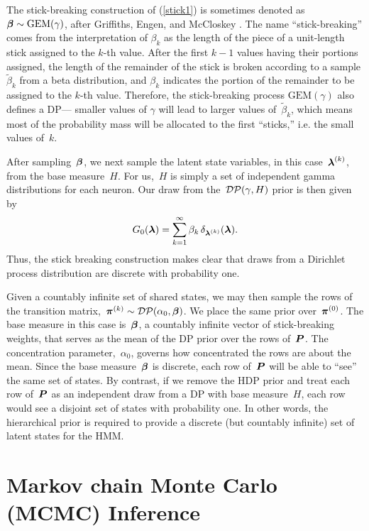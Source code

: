 The stick-breaking construction of (\ref{stick1}) is sometimes denoted
as~${\boldsymbol{\beta} \sim \mathrm{GEM}(\gamma)}$, after Griffiths, Engen, and
McCloskey \citep{Ewens90}.  The name ``stick-breaking'' comes from the
interpretation of $\beta_k$ as the length of the piece of a
unit-length stick assigned to the $k$-th value.  After the first $k-1$
values having their portions assigned, the length of the remainder of
the stick is broken according to a sample $\widetilde{\beta}_k$ from a
beta distribution, and ${\beta}_k$ indicates the portion of the
remainder to be assigned to the $k$-th value. Therefore, the
stick-breaking process $\mathrm{GEM}(\gamma)$ also defines a DP---
smaller values of $\gamma$ will lead to larger values
of~$\widetilde{\beta}_k$, which means most of the probability mass
will be allocated to the first ``sticks,'' i.e. the small values
of~$k$.

After sampling~$\boldsymbol{\beta}$, we next sample the latent state variables, in
this case~${\boldsymbol{\lambda}^{(k)}}$, from the base measure~$H$. For us,~$H$ is 
simply a set of independent gamma distributions for each neuron.
Our draw from
the~${\mathcal{DP}(\gamma,H)}$ prior is then given by
\begin{align*}
G_0(\boldsymbol{\lambda})=\sum_{k=1}^\infty \beta_k \, \delta_{\boldsymbol{\lambda}^{(k)}}(\boldsymbol{\lambda}).
\end{align*}
Thus, the stick breaking construction makes clear that draws from a
Dirichlet process distribution are discrete with probability one.

Given a countably infinite set of shared states, we may then sample
the rows of the transition
matrix,~${\boldsymbol{\pi}^{(k)}\sim\mathcal{DP}(\alpha_0,\boldsymbol{\beta})}$. We place the
same prior over~$\boldsymbol{\pi}^{(0)}$.  The base measure in this case is~$\boldsymbol{\beta}$, a
countably infinite vector of stick-breaking weights, that serves as
the mean of the DP prior over the rows of~$\boldsymbol{P}$. The concentration
parameter,~$\alpha_0$, governs how concentrated the rows are about the
mean. Since the base measure~$\boldsymbol{\beta}$ is discrete, each row of~$\boldsymbol{P}$
will be able to ``see'' the same set of states. By contrast, if we
remove the HDP prior and treat each row of~$\boldsymbol{P}$ as an independent draw
from a DP with base measure~$H$, each row would see a disjoint set of
states with probability one. In other words, the hierarchical prior is
required to provide a discrete (but countably infinite) set of latent
states for the HMM.

\section{Markov chain Monte Carlo (MCMC) Inference}



